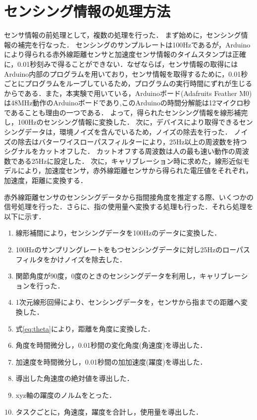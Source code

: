 \section{センシング情報の処理方法}
センサ情報の前処理として，複数の処理を行った．
まず始めに，センシング情報の補完を行なった．
センシングのサンプルレートは100Hzであるが，Arduinoにより得られる赤外線距離センサと加速度センサ情報のタイムスタンプは正確に，0.01秒刻みで得ることができない．なぜならば，センサ情報の取得にはArduino内部のプログラムを用いており，センサ情報を取得するために，0.01秒ごとにプログラムをループしているため，プログラムの実行時間にずれが生じるからである．また，本実験で用いている，Arduinoボード(Adafruits Feather M0)は48MHz動作のArduinoボードであり,このArduinoの時間分解能は12マイクロ秒であることも理由の一つである．
よって，得られたセンシング情報を線形補完し，100Hzのセンシング情報に変換した．
次に，デバイスにより取得できるセンシングデータは，環境ノイズを含んでいるため，ノイズの除去を行った．
ノイズの除去はバターワイスローパスフィルターにより，25Hz以上の周波数を持つシグナルをカットオフした．
カットオフする周波数は人の最も速い動作の周波数である25Hz\cite{Friedman2014,VanGalen1990,Mason2001,Simone2007}に設定した．
次に，キャリブレーション時に求めた，線形近似モデルにより，加速度センサ，赤外線距離センサから得られた電圧値をそれぞれ，加速度，距離に変換する．



赤外線距離センサのセンシングデータから指間接角度を推定する際、いくつかの信号処理を行った．さらに、指の使用量へ変換する処理も行った．それら処理を以下に示す．

\begin{enumerate}
 \item 線形補間により，センシングデータを100Hzのデータに変換した．
 \item 100Hzのサンプリングレートをもつセンシングデータに対し25Hzのローパスフィルタをかけノイズを除去した．
\item 関節角度が90度，0度のときのセンシングデータを利用し，キャリブレーションを行った．
 \item 1次元線形回帰により、センシングデータを，センサから指までの距離へ変換した．
 \item 式\ref{eq:theta}により，距離を角度に変換した．
 \item 角度を時間微分し，0.01秒間の変化角度(角速度)を導出した．
 \item 加速度を時間微分し，0.01秒間の加加速度(躍度)を導出した．
 \item 導出した角速度の絶対値を導出した．
 \item xyz軸の躍度のノルムをとった．
 \item タスクごとに，角速度，躍度を合計し，使用量を導出した．
\end{enumerate}


